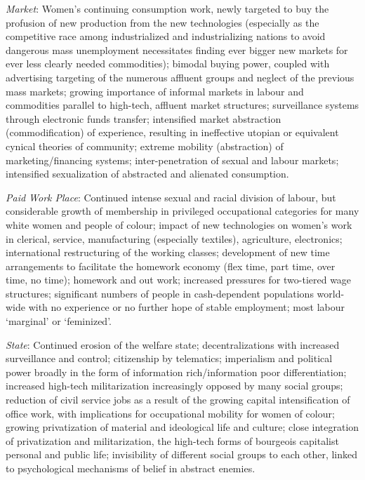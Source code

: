 \documentclass[DIV=12,%
               BCOR=10mm,%
               headinclude=false,%
               footinclude=false,open=any,%
               fontsize=11pt,%
               twoside,%
               paper=210mm:11in]%
               {scrbook}
\newcommand*{\Slash}{\slash\hspace{0pt}}
\begin{document}
\emph{Market}: Women’s continuing consumption work, newly targeted to buy the profusion of new production from the new technologies (especially as the competitive race among industrialized and industrializing nations to avoid dangerous mass unemployment necessitates finding ever bigger new markets for ever less clearly needed commodities); bimodal buying power, coupled with advertising targeting of the numerous affluent groups and neglect of the previous mass markets; growing importance of informal markets in labour and commodities parallel to high-tech, affluent market structures; surveillance systems through electronic funds transfer; intensified market abstraction (commodification) of experience, resulting in ineffective utopian or equivalent cynical theories of community; extreme mobility (abstraction) of marketing\Slash{}financing systems; inter-penetration of sexual and labour markets; intensified sexualization of abstracted and alienated consumption.


\emph{Paid Work Place}: Continued intense sexual and racial division of labour, but considerable growth of membership in privileged occupational categories for many white women and people of colour; impact of new technologies on women’s work in clerical, service, manufacturing (especially textiles), agriculture, electronics; international restructuring of the working classes; development of new time arrangements to facilitate the homework economy (flex time, part time, over time, no time); homework and out work; increased pressures for two-tiered wage structures; significant numbers of people in cash-dependent populations world-wide with no experience or no further hope of stable employment; most labour ‘marginal’ or ‘feminized’.


\emph{State}: Continued erosion of the welfare state; decentralizations with increased surveillance and control; citizenship by telematics; imperialism and political power broadly in the form of information rich\Slash{}information poor differentiation; increased high-tech militarization increasingly opposed by many social groups; reduction of civil service jobs as a result of the growing capital intensification of office work, with implications for occupational mobility for women of colour; growing privatization of material and ideological life and culture; close integration of privatization and militarization, the high-tech forms of bourgeois capitalist personal and public life; invisibility of different social groups to each other, linked to psychological mechanisms of belief in abstract enemies.
\end{document}
